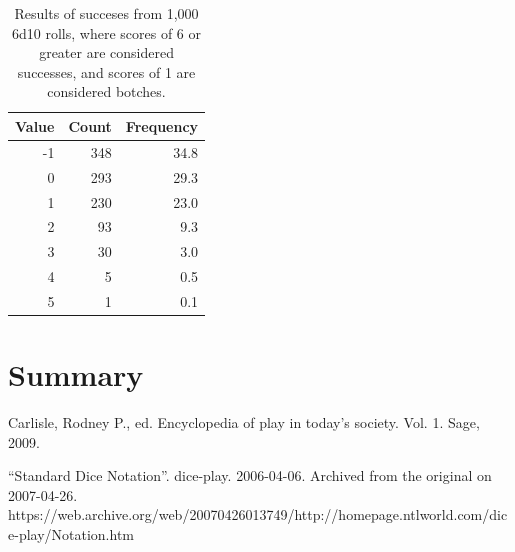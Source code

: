 \documentclass[twocolumn,letterpaper]{article}  %
\begin{document}
\begin{table}%
\begin{center}
\begin{tabular}{*{3}{r}}
\toprule
Value & Count & Frequency \\
\midrule
 -1   & 348      & 34.8 \\
  0   & 293      & 29.3 \\
  1   & 230      & 23.0 \\
  2   &  93      &  9.3 \\
  3   &  30      &  3.0 \\
  4   &   5      &  0.5 \\
  5   &   1      &  0.1 \\
\bottomrule
\end{tabular}
\end{center}
\caption{Results of succeses from 1,000 6d10 rolls, where scores of 6 or greater are considered successes, and scores of 1 are considered botches.}
\end{table}

\section{Summary}



%
\begin{thebibliography}{1}

Carlisle, Rodney P., ed. Encyclopedia of play in today's society. Vol. 1. Sage, 2009.

``Standard Dice Notation''. dice-play. 2006-04-06. Archived from the original on 2007-04-26. https://web.archive.org/web/20070426013749/http://homepage.ntlworld.com/dice-play/Notation.htm

\end{thebibliography}

\clearpage
\onecolumn
\appendix{}               %
\end{document}
